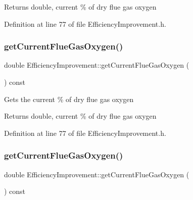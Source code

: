 \begin{DoxyReturn}{Returns}
double, current \% of dry flue gas oxygen 
\end{DoxyReturn}


Definition at line 77 of file Efficiency\+Improvement.\+h.

\mbox{\label{class_efficiency_improvement_a8b66a676d696f7a9fcc8fa987371d80b}} 
\subsubsection{\texorpdfstring{get\+Current\+Flue\+Gas\+Oxygen()}{getCurrentFlueGasOxygen()}\hspace{0.1cm}{\footnotesize\ttfamily [2/3]}}
{\footnotesize\ttfamily double Efficiency\+Improvement\+::get\+Current\+Flue\+Gas\+Oxygen (\begin{DoxyParamCaption}{ }\end{DoxyParamCaption}) const\hspace{0.3cm}{\ttfamily [inline]}}

Gets the current \% of dry flue gas oxygen

\begin{DoxyReturn}{Returns}
double, current \% of dry flue gas oxygen 
\end{DoxyReturn}


Definition at line 77 of file Efficiency\+Improvement.\+h.

\mbox{\label{class_efficiency_improvement_a8b66a676d696f7a9fcc8fa987371d80b}} 
\subsubsection{\texorpdfstring{get\+Current\+Flue\+Gas\+Oxygen()}{getCurrentFlueGasOxygen()}\hspace{0.1cm}{\footnotesize\ttfamily [3/3]}}
{\footnotesize\ttfamily double Efficiency\+Improvement\+::get\+Current\+Flue\+Gas\+Oxygen (\begin{DoxyParamCaption}{ }\end{DoxyParamCaption}) const\hspace{0.3cm}{\ttfamily [inline]}}

